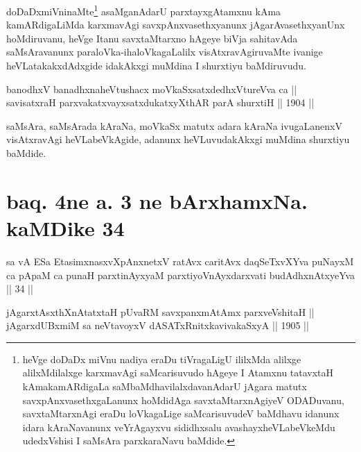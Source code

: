 \begin{artha}
doDaDxmiVninaMte\footnote{heVge doDaDx miVnu nadiya eraDu
tiVragaLigU ililxMda alilxge alilxMdilalxge karxmavAgi saMcarisuvudo
hAgeye I Atamxnu tatavxtaH kAmakamARdigaLa saMbaMdhavilalxdavanAdarU
jAgara matutx savxpAnxvasethxgaLanunx hoMdidAga savxtaMtarxnAgiyeV
ODADuvanu, savxtaMtarxnAgi eraDu loVkagaLige saMcarisuvudeV baMdhavu
idanunx idara kAraNavanunx veYrAgayxvu sididhxsalu avashayxheVLabeVkeMdu udedxVshisi I saMsAra parxkaraNavu baMdide.} asaMganAdarU parxtayxgAtamxnu kAma
kamARdigaLiMda karxmavAgi savxpAnxvasethxyanunx jAgarAvasethxyanUnx
hoMdiruvanu, heVge Itanu savxtaMtarxno hAgeye biVja sahitavAda
saMsAravanunx paraloVka-ihaloVkagaLalilx visAtxravAgiruvaMte ivanige
heVLatakakxdAdxgide idakAkxgi muMdina I shurxtiyu baMdiruvudu.
\end{artha}


\begin{shl}
banodhxV banadhxnaheVtushacx moVkaSxsatxdedhxVtureVva ca || \\
savisatxraH parxvakatxvayxsatxdukatxyXthAR parA shurxtiH \hfill || 1904 ||
  
\end{shl}

\begin{artha}
saMsAra, saMsArada kAraNa, moVkaSx matutx adara kAraNa ivugaLanenxV
visAtxravAgi heVLabeVkAgide, adanunx heVLuvudakAkxgi muMdina shurxtiyu
baMdide.
\end{artha}

\section*{baq. 4ne a. 3 ne bArxhamxNa. kaMDike 34}

\begin{shl}
sa vA ESa EtasimxnasxvXpAnxnetxV ratAvx caritAvx daqSeTxvXYva puNayxM ca pApaM ca punaH parxtinAyxyaM parxtiyoVnAyxdarxvati budAdhxnAtxyeYva || 34 ||
\end{shl}


\begin{shl}
\footnotemark[1]jAgarxtAsxthXnAtatxtaH pUvaRM savxpanxmAtAmx parxveVshitaH || \\
jAgarxdUBxmiM sa neVtavoyxV dASATxRnitxkavivakaSxyA \hfill || 1905 ||
  
\end{shl}

